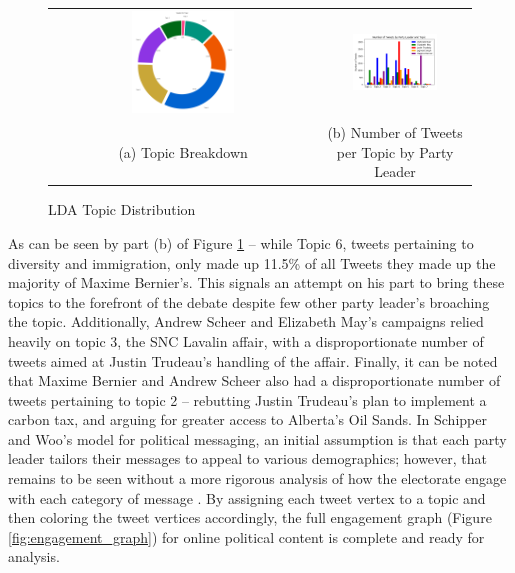 \begin{figure}[h!]
  \centering
  \begin{tabular}{cc}
    \includegraphics[width=0.40\textwidth]{Figures/topic_distribution} &
    \includegraphics[width=0.60\textwidth]{Figures/grouped_bar_by_pl_topic} \\
  (a) Topic Breakdown & (b) Number of Tweets per Topic by Party Leader \\[6pt]
  \end{tabular}
  \caption[LDA Topic Distribution]{LDA Topic Distribution}
  \label{fig:topic_distribution}
\end{figure}

As can be seen by part (b) of Figure \ref{fig:topic_distribution} -- while Topic
6, tweets pertaining to diversity and immigration, only made up 11.5\% of all
Tweets they made up the majority of Maxime Bernier's. This signals an attempt on
his part to bring these topics to the forefront of the debate despite few other
party leader's broaching the topic. Additionally, Andrew Scheer and Elizabeth
May's campaigns relied heavily on topic 3, the SNC Lavalin affair, with a
disproportionate number of tweets aimed at Justin Trudeau's handling of the
affair. Finally, it can be noted that Maxime Bernier and Andrew Scheer also had
a disproportionate number of tweets pertaining to topic 2 -- rebutting Justin
Trudeau's plan to implement a carbon tax, and arguing for greater access to
Alberta's Oil Sands. In Schipper and Woo's model for political messaging, an
initial assumption is that each party leader tailors their messages to appeal
to various demographics; however, that remains to be seen without a more
rigorous analysis of how the electorate engage with each category of message
\cite{schipper2018political}. By assigning each tweet vertex to a topic and then
coloring the tweet vertices accordingly, the full engagement graph (Figure
\ref{fig:engagement_graph}) for online political content is complete and ready
for analysis. 

